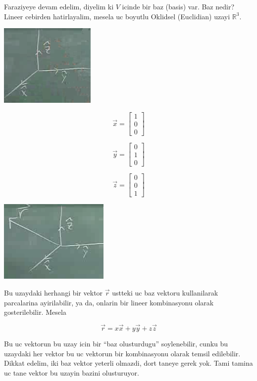 \documentclass[12pt,fleqn]{article}
\begin{document}
Faraziyeye devam edelim, diyelim ki $V$ icinde bir baz (basis) var. Baz
nedir? Lineer cebirden hatirlayalim, mesela uc boyutlu Oklidsel (Euclidian)
uzayi $\mathbb{R}^3$. 

\includegraphics[height=4cm]{1_6.png}


\[ 
\vec{x} = 
\left[\begin{array}{r}
1 \\ 0 \\ 0
\end{array}\right]
 \]

\[ 
\vec{y} = 
\left[\begin{array}{r}
0 \\ 1 \\ 0
\end{array}\right]
 \]

\[ 
\vec{z} = 
\left[\begin{array}{r}
0 \\ 0 \\ 1
\end{array}\right]
 \]

\includegraphics[height=4cm]{1_7.png}

Bu uzaydaki herhangi bir vektor $\vec{r}$ ustteki uc baz vektoru
kullanilarak parcalarina ayirilabilir, ya da, onlarin bir lineer
kombinasyonu olarak gosterilebilir. Mesela

\[ \vec{r} = x\vec{x} +  y\vec{y} +  z\vec{z} \]

Bu uc vektorun bu uzay icin bir ``baz olusturdugu'' soylenebilir, cunku bu
uzaydaki her vektor bu uc vektorun bir kombinasyonu olarak temsil
edilebilir. Dikkat edelim, iki baz vektor yeterli olmazdi, dort taneye
gerek yok. Tami tamina uc tane vektor bu uzayin bazini olusturuyor. 
\end{document}
